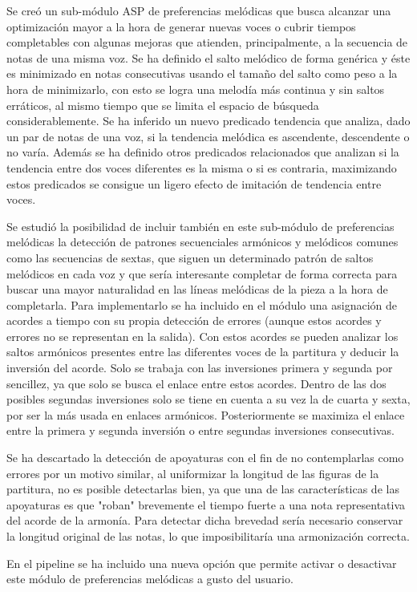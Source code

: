 Se creó un sub-módulo ASP de preferencias melódicas que busca alcanzar una optimización mayor a la hora de generar nuevas voces o cubrir tiempos completables con algunas mejoras que atienden, principalmente, a la secuencia de notas de una misma voz. Se ha definido el salto melódico de forma genérica y éste es minimizado en notas consecutivas usando el tamaño del salto como peso a la hora de minimizarlo, con esto se logra una melodía más continua y sin saltos erráticos, al mismo tiempo que se limita el espacio de búsqueda considerablemente. Se ha inferido un nuevo predicado tendencia que analiza, dado un par de notas de una voz, si la tendencia melódica es ascendente, descendente o no varía. Además se ha definido otros predicados relacionados que analizan si la tendencia entre dos voces diferentes es la misma o si es contraria, maximizando estos predicados se consigue un ligero efecto de imitación de tendencia entre voces.

Se estudió la posibilidad de incluir también en este sub-módulo de preferencias melódicas la detección de patrones secuenciales armónicos y melódicos comunes como las secuencias de sextas, que siguen un determinado patrón de saltos melódicos en cada voz y que sería interesante completar de forma correcta para buscar una mayor naturalidad en las líneas melódicas de la pieza a la hora de completarla. Para implementarlo se ha incluido en el módulo una asignación de acordes a tiempo con su propia detección de errores (aunque estos acordes y errores no se representan en la salida). Con estos acordes se pueden analizar los saltos armónicos presentes entre las diferentes voces de la partitura y deducir la inversión del acorde. Solo se trabaja con las inversiones primera y segunda por sencillez, ya que solo se busca el enlace entre estos acordes. Dentro de las dos posibles segundas inversiones solo se tiene en cuenta a su vez la  de cuarta y sexta, por ser la más usada en enlaces armónicos. Posteriormente se maximiza el enlace entre la primera y segunda inversión o entre segundas inversiones consecutivas.

Se ha descartado la detección de apoyaturas con el fin de no contemplarlas como errores por un motivo similar, al uniformizar la longitud de las figuras de la partitura, no es posible detectarlas bien, ya que una de las características de las apoyaturas es que "roban" brevemente el tiempo fuerte a una nota representativa del acorde de la armonía. Para detectar dicha brevedad sería necesario conservar la longitud original de las notas, lo que imposibilitaría una armonización correcta.

En el pipeline se ha incluido una nueva opción que permite activar o desactivar este módulo de preferencias melódicas a gusto del usuario.

